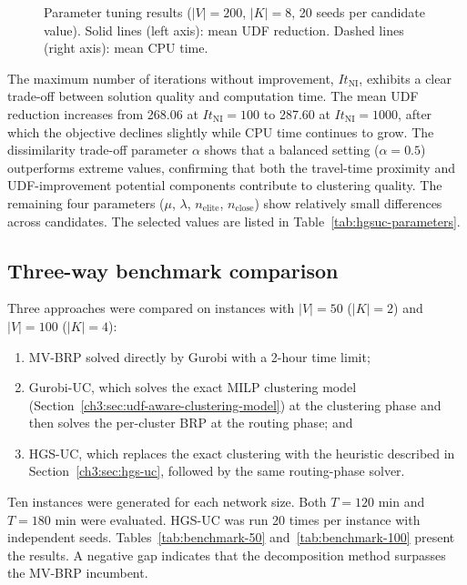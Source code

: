 \begin{figure}[htbp]
\centering
{}
\caption{Parameter tuning results ($\mid V\mid =200$, $\left| K \right|=8$, 20 seeds per candidate value). Solid lines (left axis): mean UDF reduction. Dashed lines (right axis): mean CPU time.}
\label{ch3:fig:parameter-tuning}
\end{figure}

The maximum number of iterations without improvement, $I{{t}_{\text{NI}}}$, exhibits a clear trade-off between solution quality and computation time. The mean UDF reduction increases from 268.06 at $I{{t}_{\text{NI}}}=100$ to 287.60 at $I{{t}_{\text{NI}}}=1000$, after which the objective declines slightly while CPU time continues to grow. The dissimilarity trade-off parameter $\alpha $ shows that a balanced setting ($\alpha =0.5$) outperforms extreme values, confirming that both the travel-time proximity and UDF-improvement potential components contribute to clustering quality. The remaining four parameters ($\mu $, $\lambda $, ${{n}_{\text{elite}}}$, ${{n}_{\text{close}}}$) show relatively small differences across candidates. The selected values are listed in Table~\ref{tab:hgsuc-parameters}.

\subsection{Three-way benchmark comparison}\label{ch3:subsec:three-way-benchmark}

Three approaches were compared on instances with $\mid V\mid =50$ ($\left| K \right|=2$) and $\mid V\mid =100$ ($\left| K \right|=4$):

\begin{enumerate}[label=(\roman*)]
\item MV-BRP solved directly by Gurobi with a 2-hour time limit;
\item Gurobi-UC, which solves the exact MILP clustering model (Section~\ref{ch3:sec:udf-aware-clustering-model}) at the clustering phase and then solves the per-cluster BRP at the routing phase; and
\item HGS-UC, which replaces the exact clustering with the heuristic described in Section~\ref{ch3:sec:hgs-uc}, followed by the same routing-phase solver.
\end{enumerate}

Ten instances were generated for each network size. Both $T=120$ min and $T=180$ min were evaluated. HGS-UC was run 20 times per instance with independent seeds. Tables~\ref{tab:benchmark-50} and~\ref{tab:benchmark-100} present the results. A negative gap indicates that the decomposition method surpasses the MV-BRP incumbent.

